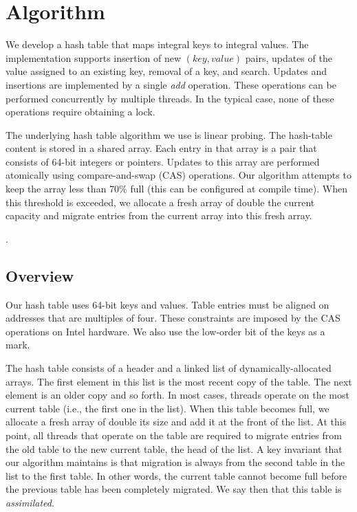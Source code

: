 \section{Algorithm}
\label{sec:algo}

We develop a hash table that maps integral keys to integral
values. The implementation supports insertion of new $(key,value)$
pairs, updates of the value assigned to an existing key, removal of a
key, and search. Updates and insertions are implemented by a single
{\em add\/} operation. These operations can be performed concurrently
by multiple threads. In the typical case, none of these operations
require obtaining a lock.

The underlying hash table algorithm we use is linear probing. The
hash-table content is stored in a shared array. Each entry in that
array is a pair that consists of 64-bit integers or pointers. Updates
to this array are performed atomically using compare-and-swap (CAS)
operations. Our algorithm attempts to keep the array less than 70\%
full (this can be configured at compile time). When this threshold is
exceeded, we allocate a fresh array of double the current capacity and
migrate entries from the current array into this fresh array.

.

\subsection{Overview}

Our hash table uses 64-bit keys and values. Table entries must be
aligned on addresses that are multiples of four. These constraints are
imposed by the CAS operations on Intel hardware. We also use the low-order
bit of the keys as a mark.

The hash table consists of a header and a linked list of
dynamically-allocated arrays.  The first element in this list is the
most recent copy of the table. The next element is an older copy and
so forth.  In most cases, threads operate on the most current table
(i.e., the first one in the list). When this table becomes full, we
allocate a fresh array of double its size and add it at the front of
the list.  At this point, all threads that operate on the table are
required to migrate entries from the old table to the new current
table, the head of the list. A key invariant that our algorithm
maintains is that migration is always from the second table in the
list to the first table. In other words, the current table cannot
become full before the previous table has been completely migrated.
We say then that this table is {\em assimilated\/}.

